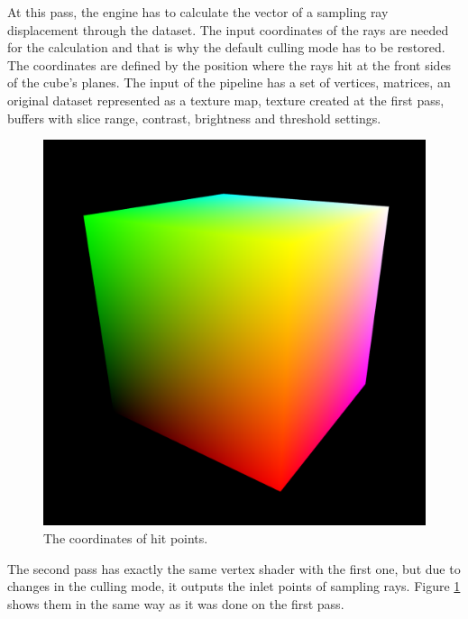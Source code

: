 \documentclass[twoside, english, 11pt]{report}
\begin{document}
At this pass, the engine has to calculate the vector of a sampling ray displacement through the dataset. The input coordinates of the rays are needed for the calculation and that is why the default culling mode has to be restored. The coordinates are defined by the position where the rays hit at the front sides of the cube's planes. The input of the pipeline has a set of vertices, matrices, an original dataset represented as a texture map, texture created at the first pass, buffers with slice range, contrast, brightness and threshold settings.\\
\begin{figure}[!h]
\centerline{\includegraphics[scale = 0.31]{img/second}}
\caption{The coordinates of hit points.\label{fig:second}}
\end{figure}

The second pass has exactly the same vertex shader with the first one, but due to changes in the culling mode, it outputs the inlet points of sampling rays. Figure \ref{fig:second} shows them in the same way as it was done on the first pass.\\
\end{document}
